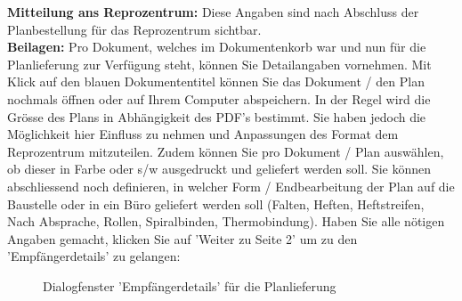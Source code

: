 \textbf{Mitteilung ans Reprozentrum:} Diese Angaben sind nach Abschluss der Planbestellung für das Reprozentrum sichtbar. \\
\textbf{Beilagen:} Pro Dokument, welches im Dokumentenkorb war und nun für die Planlieferung zur Verfügung steht, können Sie Detailangaben vornehmen.   Mit Klick auf den blauen Dokumententitel können Sie das Dokument / den Plan nochmals öffnen oder auf Ihrem Computer abspeichern.
In der Regel wird die Grösse des Plans in Abhängigkeit des PDF's bestimmt. Sie haben jedoch die Möglichkeit hier Einfluss zu nehmen und Anpassungen des Format dem Reprozentrum mitzuteilen. Zudem können Sie pro Dokument / Plan auswählen, ob dieser in Farbe oder s/w ausgedruckt und geliefert werden soll. Sie können abschliessend noch definieren, in welcher Form / Endbearbeitung der Plan auf die Baustelle oder in ein Büro geliefert werden soll (Falten, Heften, Heftstreifen, Nach Absprache, Rollen, Spiralbinden, Thermobindung).
Haben Sie alle nötigen Angaben gemacht, klicken Sie auf 'Weiter zu Seite 2' um zu den 'Empfängerdetails' zu gelangen:

\begin{figure}[H]
\caption{Dialogfenster 'Empfängerdetails' für die Planlieferung}
\end{figure}

